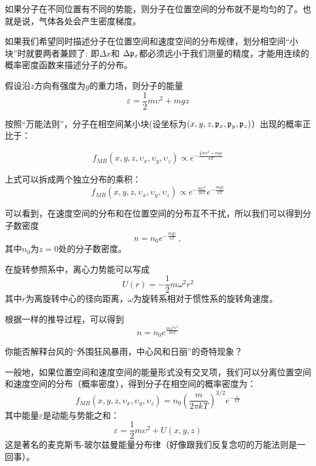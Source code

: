 \documentclass[CJK]{beamer}
\begin{document}
\begin{frame}
\bch
\bitem
\item{如果分子在不同位置有不同的势能，则分子在位置空间的分布就不是均匀的了。也就是说，气体各处会产生密度梯度。}
\item{如果我们希望同时描述分子在位置空间和速度空间的分布规律，划分相空间“小块”时就要两者兼顾了: 即$\Delta x$和
$\Delta {\mathfrak{p}}_x$都必须远小于我们测量的精度，才能用连续的概率密度函数来描述分子的分布。}
\eitem
\ech
\end{frame}


\begin{frame}
\bch
假设沿$z$方向有强度为$g$的重力场，则分子的能量
$$\varepsilon = \frac{1}{2}m\upsilon^2 + mgz$$

按照“万能法则”，分子在相空间某小块(设坐标为$(x, y, z, {\mathfrak{p}}_x, {\mathfrak{p}}_y, {\mathfrak{p}}_z)$）出现的概率正比于：

$$f_{MB}(x, y, z, \upsilon_x, \upsilon_y,\upsilon_z) \propto e^{-\frac{\frac{1}{2}m\upsilon^2 + mgz}{kT}}$$

上式可以拆成两个独立分布的乘积：
$$f_{MB}(x, y, z, \upsilon_x, \upsilon_y,\upsilon_z) \propto e^{-\frac{m\upsilon^2}{2kT}} e^{-\frac{mgz}{kT}}$$

可以看到，在速度空间的分布和在位置空间的分布互不干扰，所以我们可以得到分子数密度
$$n = n_0 e^{-\frac{mgz}{kT}}\, ,$$
其中$n_0$为$z=0$处的分子数密度。
\ech
\end{frame}

\begin{frame}
\bch
在旋转参照系中，离心力势能可以写成
$$U(r) = -\frac{1}{2}m\omega^2r^2$$
其中$r$为离旋转中心的径向距离，$\omega$为旋转系相对于惯性系的旋转角速度。

\skipline

根据一样的推导过程，可以得到
$$n = n_0 e^{\frac{m\omega^2r^2}{2kT}}$$
\ech
\end{frame}


\begin{frame}
\bch
{}
你能否解释台风的“外围狂风暴雨，中心风和日丽”的奇特现象？
\ech
\end{frame}

\begin{frame}
\bch
一般地，如果位置空间和速度空间的能量形式没有交叉项，我们可以分离位置空间和速度空间的分布（概率密度），得到分子在相空间的概率密度为：
$$f_{MB}(x, y, z,\upsilon_x, \upsilon_y,\upsilon_z) = n_0 \left(\frac{m}{2\pi kT}\right)^{3/2} e^{-\frac{\varepsilon}{kT}} $$
其中能量$\varepsilon$是动能与势能之和：
$$\varepsilon = \frac{1}{2}m\upsilon^2 + U(x,y,z)$$
这是著名的麦克斯韦-玻尔兹曼能量分布律（\wulian 好像跟我们反复念叨的万能法则是一回事）。
\ech
\end{frame}
\end{document}
